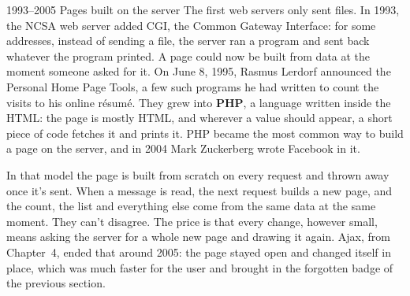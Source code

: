 \begin{history}{1993--2005 \textperiodcentered{} Pages built on the server}
The first web servers only sent files. In 1993, the NCSA web server added CGI,
the Common Gateway Interface: for some addresses, instead of sending a file, the
server ran a program and sent back whatever the program printed. A page could
now be built from data at the moment someone asked for it. On June 8, 1995,
Rasmus Lerdorf announced the Personal Home Page Tools, a few such programs he
had written to count the visits to his online résumé. They grew into
\textbf{PHP}, a language written inside the HTML: the page is mostly HTML, and
wherever a value should appear, a short piece of code fetches it and prints it.
PHP became the most common way to build a page on the server, and in 2004 Mark
Zuckerberg wrote Facebook in it.

In that model the page is built from scratch on every request and thrown away
once it's sent. When a message is read, the next request builds a new page, and
the count, the list and everything else come from the same data at the same
moment. They can't disagree. The price is that every change, however small,
means asking the server for a whole new page and drawing it again. Ajax, from
Chapter~4, ended that around 2005: the page stayed open and changed itself in
place, which was much faster for the user and brought in the forgotten badge
of the previous section.
\end{history}

